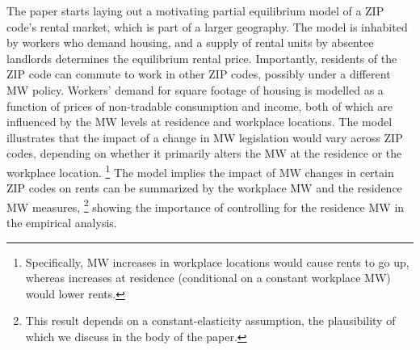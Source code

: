 
The paper starts laying out a motivating partial equilibrium model of a ZIP 
code's rental market, which is part of a larger geography.
The model is inhabited by workers who demand housing, and a supply of rental 
units by absentee landlords determines the equilibrium rental price.
Importantly, residents of the ZIP code can commute to work in other ZIP 
codes, possibly under a different MW policy.
Workers' demand for square footage of housing is modelled as a function of 
prices of non-tradable consumption and income, both of which are influenced by 
the MW levels at residence and workplace locations.
The model illustrates that the impact of a change in MW legislation would vary 
across ZIP codes, depending on whether it primarily alters the MW at the
residence or the workplace location.%
\footnote{Specifically, MW increases in workplace locations would cause rents to 
    go up, whereas increases at residence (conditional on a constant 
    workplace MW) would lower rents.}
The model implies the impact of MW changes in certain ZIP codes on rents can 
be summarized by the workplace MW and the residence MW measures,%
\footnote{This result depends on a constant-elasticity assumption, the plausibility
    of which we discuss in the body of the paper.}
showing the importance of controlling for the residence MW in the empirical 
analysis.


